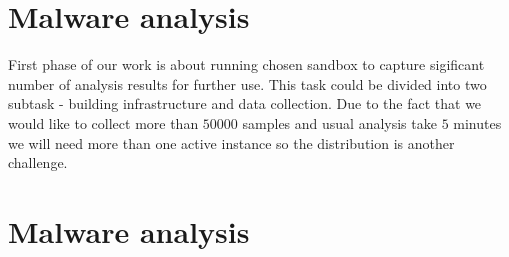 \chapter{Malware analysis}
First phase of our work is about running chosen sandbox to capture sigificant number of analysis results for further use. This task could be divided into two subtask - building infrastructure and data collection. Due to the fact that we would like to collect more than $50 000$ samples and usual analysis take $5$ minutes we will need more than one active instance so the distribution is another challenge.

\chapter{Malware analysis}
